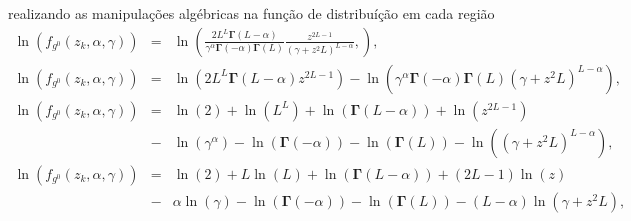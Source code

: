 realizando as manipulações algébricas na função de distribuíção em cada região
\begin{equation*}
\begin{array}{ccc}
	\ln{(f_{g^{0}}(z_{k}, \alpha, \gamma))}&=&\ln{\left(\frac{2L^{L}\mathbf{\Gamma}(L-\alpha)}{\gamma^{\alpha}\mathbf{\Gamma}(-\alpha)\mathbf{\Gamma}(L)}\frac{z^{2L-1}}{(\gamma+z^2L)^{L-\alpha}},\right)}, \\
	\ln{(f_{g^{0}}(z_{k}, \alpha, \gamma))}&=&\ln{(2L^{L}\mathbf{\Gamma}(L-\alpha)z^{2L-1})}-\ln{(\gamma^{\alpha}\mathbf{\Gamma}(-\alpha)\mathbf{\Gamma}(L)(\gamma+z^2L)^{L-\alpha})}, \\
	\ln{(f_{g^{0}}(z_{k}, \alpha, \gamma))}&=&\ln{(2)}+\ln{(L^{L})}+\ln{(\mathbf{\Gamma}(L-\alpha))}+\ln{(z^{2L-1})} \\
	    &-&\ln{(\gamma^{\alpha})} -\ln{(\mathbf{\Gamma}(-\alpha))}-\ln{(\mathbf{\Gamma}(L))}-\ln{((\gamma+z^2L)^{L-\alpha})}, \\
	\ln{(f_{g^{0}}(z_{k}, \alpha, \gamma))}&=&\ln{(2)}+L\ln{(L)}+\ln{(\mathbf{\Gamma}(L-\alpha))}+(2L-1)\ln{(z)} \\
	    &-&\alpha\ln{(\gamma)} -\ln{(\mathbf{\Gamma}(-\alpha))}-\ln{(\mathbf{\Gamma}(L))}-(L-\alpha)\ln{(\gamma+z^2L)}, \\
\end{array}
\end{equation*}

